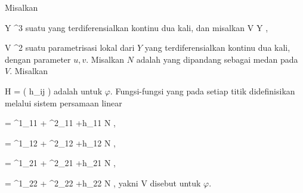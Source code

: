 {}
{

Misalkan

\mavergleichskette
{\vergleichskette
{ Y
}
{ \subseteq }{ \R^3
}
{  }{
}
{    }{
}
{   }{
}
}
{}{}{}
suatu
yang terdiferensialkan kontinu dua kali, dan misalkan
\maabbdisp {\varphi} { V } { Y
} {,}

\mavergleichskette
{\vergleichskette
{ V
}
{ \subseteq }{ \R^2
}
{  }{
}
{    }{
}
{   }{
}
}
{}{}{}
suatu parametrisasi lokal dari $Y$ yang terdiferensialkan kontinu dua kali, dengan parameter $u,v$. Misalkan $N$ adalah
yang dipandang sebagai medan pada $V$. Misalkan

\mavergleichskette
{\vergleichskette
{ H
}
{ = }{ \left(  h_{ij}  \right)
}
{  }{
}
{    }{
}
{   }{
}
}
{}{}{}
adalah
untuk $\varphi$. Fungsi-fungsi yang pada setiap titik didefinisikan melalui sistem persamaan linear

\mavergleichskettedisp
{\vergleichskette
{ {  }
}
{ =} { \Gamma^1_{11}  {  } + \Gamma^2_{11} {  } +h_{11} N
}
{ } {
}
{ } {
}
{ } {
}
}
{}{}{,}

\mavergleichskettedisp
{\vergleichskette
{ {  } {  }
}
{ =} { \Gamma^1_{12} {  } + \Gamma^2_{12}  {  } +h_{12} N
}
{ } {
}
{ } {
}
{ } {
}
}
{}{}{,}

\mavergleichskettedisp
{\vergleichskette
{ {  } {  }
}
{ =} { \Gamma^1_{21} {  } + \Gamma^2_{21}   {  } +h_{21} N
}
{ } {
}
{ } {
}
{ } {
}
}
{}{}{,}

\mavergleichskettedisp
{\vergleichskette
{ {  }
}
{ =} { \Gamma^1_{22} {  } + \Gamma^2_{22}   {  } +h_{22} N
}
{ } {
}
{ } {
}
{ } {
}
}
{}{}{,}
yakni
 { V } {\R
} {}
disebut
untuk $\varphi$.

}

